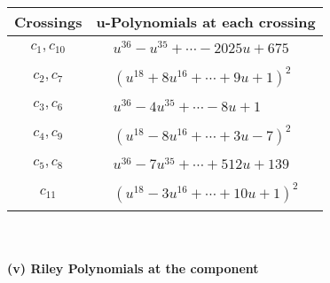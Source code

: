 \documentclass[1p]{elsarticle_modified}
\theoremstyle{definition}
\begin{document}
\begin{tabular}{m{50pt}|m{274pt}}
Crossings & \hspace{64pt}u-Polynomials at each crossing \\
\hline $$\begin{aligned}c_{1},c_{10}\end{aligned}$$&$\begin{aligned}
&u^{36}- u^{35}+\cdots-2025 u+675
\end{aligned}$\\
\hline $$\begin{aligned}c_{2},c_{7}\end{aligned}$$&$\begin{aligned}
&(u^{18}+8 u^{16}+\cdots+9 u+1)^{2}
\end{aligned}$\\
\hline $$\begin{aligned}c_{3},c_{6}\end{aligned}$$&$\begin{aligned}
&u^{36}-4 u^{35}+\cdots-8 u+1
\end{aligned}$\\
\hline $$\begin{aligned}c_{4},c_{9}\end{aligned}$$&$\begin{aligned}
&(u^{18}-8 u^{16}+\cdots+3 u-7)^{2}
\end{aligned}$\\
\hline $$\begin{aligned}c_{5},c_{8}\end{aligned}$$&$\begin{aligned}
&u^{36}-7 u^{35}+\cdots+512 u+139
\end{aligned}$\\
\hline $$\begin{aligned}c_{11}\end{aligned}$$&$\begin{aligned}
&(u^{18}-3 u^{16}+\cdots+10 u+1)^{2}
\end{aligned}$\\
\hline
\end{tabular}\\~\\
\newpage\renewcommand{\arraystretch}{1}
\flushleft \textbf{(v) Riley Polynomials at the component}\newline \\
\end{document}
